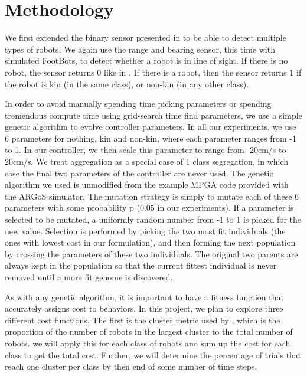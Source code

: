 \documentclass[conference]{IEEEtran}
\begin{document}
\section{Methodology}

  We first extended the binary sensor presented in \cite{gauci_self-organized_2014} to be able to detect multiple types of robots. We again use the range and bearing sensor, this time with simulated FootBots, to detect whether a robot is in line of sight. If there is no robot, the sensor returns 0 like in \cite{gauci_self-organized_2014}. If there is a robot, then the sensor returns 1 if the robot is kin (in the same class), or non-kin (in any other class).

  In order to avoid manually spending time picking parameters or spending tremendous compute time using grid-search time find parameters, we use a simple genetic algorithm to evolve controller parameters. In all our experiments, we use 6 parameters for nothing, kin and non-kin, where each parameter ranges from -1 to 1. In our controller, we then scale this parameter to range from -20cm/s to 20cm/s. We treat aggregation as a special case of 1 class segregation, in which case the final two parameters of the controller are never used. The genetic algorithm we used is unmodified from the example MPGA code provided with the ARGoS simulator. The mutation strategy is simply to mutate each of these 6 parameters with some probability p ($0.05$ in our experiments). If a parameter is selected to be mutated, a uniformly random number from -1 to 1 is picked for the new value. Selection is performed by picking the two most fit individuals (the ones with lowest cost in our formulation), and then forming the next population by crossing the parameters of these two individuals. The original two parents are always kept in the population so that the current fittest individual is never removed until a more fit genome is discovered.

  As with any genetic algorithm, it is important to have a fitness function that accurately assigns cost to behaviors. In this project, we plan to explore three different cost functions. The first is the cluster metric used by \cite{gauci_self-organized_2014}, which is the proportion of the number of robots in the largest cluster to the total number of robots. we will apply this for each class of robots and sum up the cost for each class to get the total cost. Further, we will determine the percentage of trials that reach one cluster per class by then end of some number of time steps.
\end{document}
